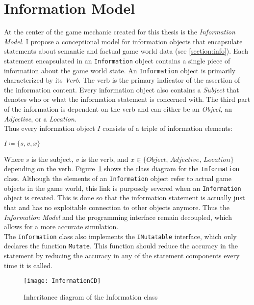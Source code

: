 \section{Information Model}
At the center of the game mechanic created for this thesis is the \textit{Information Model}. I propose a conceptional model for information objects that encapsulate statements about semantic and factual game world data (see \ref{section:info}). Each statement encapsulated in an \verb|Information| object contains a single piece of information about the game world state. An \verb|Information| object is primarily characterized by its \textit{Verb}. The verb is the primary indicator of the assertion of the information content. Every information object also contains a \textit{Subject} that denotes who or what the information statement is concerned with. The third part of the information is dependent on the verb and can either be an \textit{Object}, an \textit{Adjective}, or a \textit{Location}.\\
Thus every information object $I$ consists of a triple of information elements:
\begin{center}
	$I \coloneqq \{s, v, x\}$ 
\end{center}
Where $s$ is the subject, $v$ is the verb, and $x \in \{\textit{Object, Adjective, Location}\}$ depending on the verb. Figure~\ref{fig:informationCD} shows the class diagram for the \verb|Information| class. Although the elements of an \verb|Information| object refer to actual game objects in the game world, this link is purposely severed when an \verb|Information| object is created. This is done so that the information statement is actually just that and has no exploitable connection to other objects anymore. Thus the \textit{Information Model} and the programming interface remain decoupled, which allows for a more accurate simulation.\\
The \verb|Information| class also implements the \verb|IMutatable| interface, which only declares the function \verb|Mutate|. This function should reduce the accuracy in the statement by reducing the accuracy in any of the statement components every time it is called.
\begin{figure}
	\centering
	\texttt{[image: InformationCD]}
	\caption{Inheritance diagram of the Information class}
	\label{fig:informationCD}
\end{figure}
